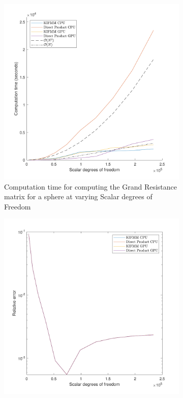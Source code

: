 \begin{figure}[ht]
     \centering
     \begin{subfigure}[b]{0.49\textwidth}
         \centering
         \includegraphics[width=\textwidth]{Images/KIFMM/Graphs/DirectProductCompTime.pdf}
         \caption{Computation time for computing the Grand Resistance matrix for a sphere at varying Scalar degrees of Freedom}
         \label{fig:DirectProductCompTime}
     \end{subfigure}
     \hfill
     \begin{subfigure}[b]{0.49\textwidth}
         \centering
         \includegraphics[width=\textwidth]{Images/KIFMM/Graphs/DirectProductComperror.pdf}

\end{subfigure}
\end{figure}
